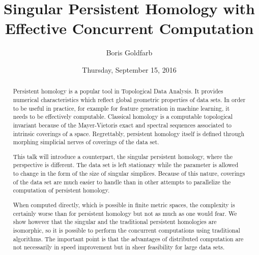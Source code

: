 \documentclass{UAmathtalk}
\author{Boris Goldfarb}
\title{Singular Persistent Homology with Effective Concurrent Computation}
\date{Thursday, September 15, 2016}
\begin{document}
\maketitle

\begin{abstract}
Persistent homology is a popular tool in Topological Data Analysis. It provides numerical characteristics which reflect global geometric properties of data sets. In order to be useful in practice, for example for feature generation in machine learning, it needs to be  effectively computable. Classical homology is a computable topological invariant because of the Mayer-Vietoris exact and spectral sequences associated to intrinsic coverings of a space. Regrettably, persistent homology itself is defined through morphing simplicial nerves of coverings of the data set.

This talk will introduce a counterpart, the singular persistent homology, where the perspective is different. The data set is left stationary while the parameter is allowed to change in the form of the size of singular simplices. Because of this nature, coverings of the data set are much easier to handle than in other attempts to parallelize the computation of persistent homology.

When computed directly, which is possible in finite metric spaces, the complexity is certainly worse than for persistent homology but not as much as one would fear. We show however that the singular and the traditional persistent homologies are isomorphic, so it is possible to perform the concurrent computations using traditional algorithms. The important point is that the advantages of distributed computation are not necessarily in speed improvement but in sheer feasibility for large data sets.
\end{abstract}
\end{document}

